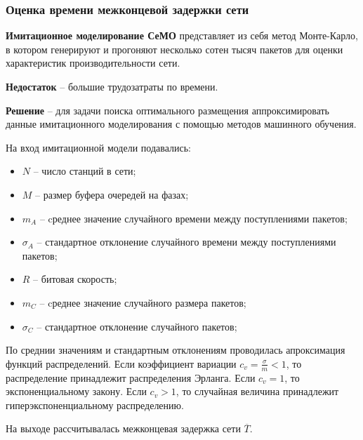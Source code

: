 \begin{frame}
    \justifying
    \frametitle{Оценка времени межконцевой задержки сети}
    \fontsize{8pt}{7.2}\selectfont

    \textbf{Имитационное моделирование СеМО} представляет из себя метод Монте-Карло, в котором генерируют и прогоняют несколько сотен тысяч пакетов для оценки характеристик производительности сети.

    \bigskip

    \textbf{Недостаток} -- большие трудозатраты по времени.
    \bigskip

    \textbf{Решение} -- для задачи поиска оптимального размещения аппроксимировать данные имитационного моделирования с помощью методов машинного обучения. 
    \bigskip

    На вход имитационной модели подавались:
    \begin{itemize}
        \item $N$ -- число станций в сети;
        \item $M$ -- размер буфера очередей на фазах;
        \item $m_A$ -- cреднее значение случайного времени между поступлениями пакетов;
        \item $\sigma_A$ -- стандартное отклонение случайного времени между поступлениями пакетов;
        \item $R$ -- битовая скорость;
        \item $m_C$ -- cреднее значение случайного размера пакетов;
        \item $\sigma_C$ -- стандартное отклонение случайного пакетов;
    \end{itemize}
    \bigskip

    По среднии значениям и стандартным отклонениям проводилась апроксимация функций распределений. Если коэффициент вариации $c_v = \frac{\sigma}{m} < 1$, то распределение принадлежит распределения Эрланга. Если $c_v =1$, то экспоненциальному закону. Если $c_v > 1$, то случайная величина принадлежит гиперэкспоненциальному распределению. 

    На выходе рассчитывалась межконцевая задержка сети $\overline{T}$. 

\end{frame}

